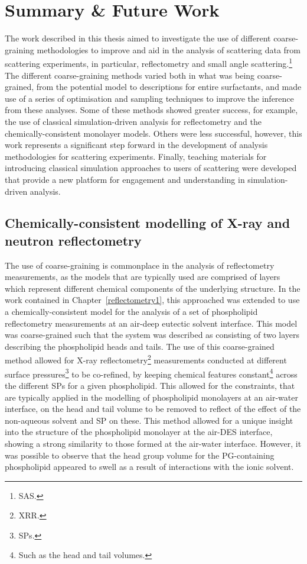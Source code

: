 \chapter{Summary \& Future Work} %
\label{summary} %
The work described in this thesis aimed to investigate the use of different coarse-graining methodologies to improve and aid in the analysis of scattering data from scattering experiments, in particular, reflectometry and small angle scattering.\footnote{SAS.}
The different coarse-graining methods varied both in what was being coarse-grained, from the potential model to descriptions for entire surfactants, and made use of a series of optimisation and sampling techniques to improve the inference from these analyses.
Some of these methods showed greater success, for example, the use of classical simulation-driven analysis for reflectometry and the chemically-consistent monolayer models.
Others were less successful, however, this work represents a significant step forward in the development of analysis methodologies for scattering experiments.
Finally, teaching materials for introducing classical simulation approaches to users of scattering were developed that provide a new platform for engagement and understanding in simulation-driven analysis.

\section{Chemically-consistent modelling of X-ray and neutron reflectometry}
The use of coarse-graining is commonplace in the analysis of reflectometry measurements, as the models that are typically used are comprised of layers which represent different chemical components of the underlying structure.
In the work contained in Chapter~\ref{reflectometry1}, this approached was extended to use a chemically-consistent model for the analysis of a set of phospholipid reflectometry measurements at an air-deep eutectic solvent interface.
This model was coarse-grained such that the system was described as consisting of two layers describing the phospholipid heads and tails.
The use of this coarse-grained method allowed for X-ray reflectometry\footnote{XRR.} measurements conducted at different surface pressures\footnote{SPs.} to be co-refined, by keeping chemical features constant\footnote{Such as the head and tail volumes.} across the different SPs for a given phospholipid.
This allowed for the constraints, that are typically applied in the modelling of phospholipid monolayers at an air-water interface, on the head and tail volume to be removed to reflect of the effect of the non-aqueous solvent and SP on these.
This method allowed for a unique insight into the structure of the phospholipid monolayer at the air-DES interface, showing a strong similarity to those formed at the air-water interface.
However, it was possible to observe that the head group volume for the PG-containing phospholipid appeared to swell as a result of interactions with the ionic solvent.

